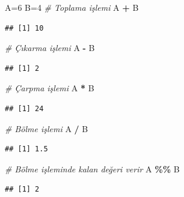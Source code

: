 \documentclass[
]{book}
\newenvironment{Shaded}{\begin{snugshade}}{\end{snugshade}}
\newcommand{\CommentTok}[1]{\textcolor[rgb]{0.56,0.35,0.01}{\textit{#1}}}
\newcommand{\DecValTok}[1]{\textcolor[rgb]{0.00,0.00,0.81}{#1}}
\newcommand{\NormalTok}[1]{#1}
\newcommand{\OtherTok}[1]{\textcolor[rgb]{0.56,0.35,0.01}{#1}}
\newcommand{\SpecialCharTok}[1]{\textcolor[rgb]{0.81,0.36,0.00}{\textbf{#1}}}
\begin{document}
\begin{Shaded}
\begin{Highlighting}[]
\NormalTok{A}\OtherTok{=}\DecValTok{6}
\NormalTok{B}\OtherTok{=}\DecValTok{4}
\CommentTok{\# Toplama işlemi}
\NormalTok{A }\SpecialCharTok{+}\NormalTok{ B}
\end{Highlighting}
\end{Shaded}

\begin{verbatim}
## [1] 10
\end{verbatim}

\begin{Shaded}
\begin{Highlighting}[]
\CommentTok{\# Çıkarma işlemi}
\NormalTok{A }\SpecialCharTok{{-}}\NormalTok{ B}
\end{Highlighting}
\end{Shaded}

\begin{verbatim}
## [1] 2
\end{verbatim}

\begin{Shaded}
\begin{Highlighting}[]
\CommentTok{\# Çarpma işlemi}
\NormalTok{A }\SpecialCharTok{*}\NormalTok{ B}
\end{Highlighting}
\end{Shaded}

\begin{verbatim}
## [1] 24
\end{verbatim}

\begin{Shaded}
\begin{Highlighting}[]
\CommentTok{\# Bölme işlemi}
\NormalTok{A }\SpecialCharTok{/}\NormalTok{ B}
\end{Highlighting}
\end{Shaded}

\begin{verbatim}
## [1] 1.5
\end{verbatim}

\begin{Shaded}
\begin{Highlighting}[]
\CommentTok{\# Bölme işleminde kalan değeri verir}
\NormalTok{A }\SpecialCharTok{\%\%}\NormalTok{ B}
\end{Highlighting}
\end{Shaded}

\begin{verbatim}
## [1] 2
\end{verbatim}
\end{document}
